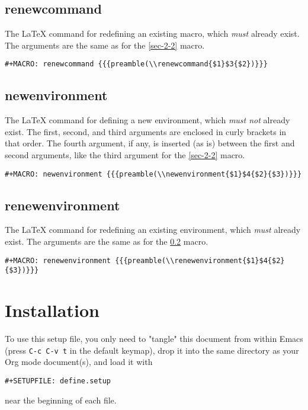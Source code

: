 \documentclass[11pt]{article}
\begin{document}
\subsection{renewcommand}
\label{sec-2-3}

The \LaTeX{} command for redefining an existing macro, which \emph{must}
already exist.  The arguments are the same as for the \ref{sec-2-2}
macro.

\begin{verbatim}
#+MACRO: renewcommand {{{preamble(\\renewcommand{$1}$3{$2})}}}
\end{verbatim}

\subsection{newenvironment}
\label{sec-2-4}

The \LaTeX{} command for defining a new environment, which \emph{must not}
already exist.  The first, second, and third arguments are enclosed in
curly brackets in that order.  The fourth argument, if any, is
inserted (as is) between the first and second arguments, like the
third argument for the \ref{sec-2-2} macro.

\begin{verbatim}
#+MACRO: newenvironment {{{preamble(\\newenvironment{$1}$4{$2}{$3})}}}
\end{verbatim}

\subsection{renewenvironment}
\label{sec-2-5}

The \LaTeX{} command for redefining an existing environment, which \emph{must}
already exist.  The arguments are the same as for the \ref{sec-2-4}
macro.

\begin{verbatim}
#+MACRO: renewenvironment {{{preamble(\\renewenvironment{$1}$4{$2}{$3})}}}
\end{verbatim}

\section{Installation}
\label{sec-3}

To use this setup file, you only need to "tangle" this document from
within Emacs (press \verb~C-c C-v t~ in the default keymap), drop it into
the same directory as your Org mode document(s), and load it with
\begin{verbatim}
#+SETUPFILE: define.setup
\end{verbatim}
near the beginning of each file.
\end{document}
